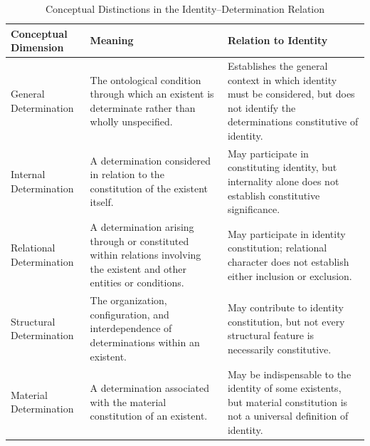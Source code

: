%
%

\begin{table}[htbp]
\centering
\caption{Conceptual Distinctions in the Identity--Determination Relation}
\label{tab:identity-determination-conceptual-distinctions}

\small
\renewcommand{\arraystretch}{1.3}

\begin{tabular}{p{} p{} p{}}
\hline
\textbf{Conceptual Dimension}
&
\textbf{Meaning}
&
\textbf{Relation to Identity}
\\
\hline

General Determination
&
The ontological condition through which an existent is determinate rather than wholly unspecified.
&
Establishes the general context in which identity must be considered, but does not identify the determinations constitutive of identity.
\\
\hline

Internal Determination
&
A determination considered in relation to the constitution of the existent itself.
&
May participate in constituting identity, but internality alone does not establish constitutive significance.
\\
\hline

Relational Determination
&
A determination arising through or constituted within relations involving the existent and other entities or conditions.
&
May participate in identity constitution; relational character does not establish either inclusion or exclusion.
\\
\hline

Structural Determination
&
The organization, configuration, and interdependence of determinations within an existent.
&
May contribute to identity constitution, but not every structural feature is necessarily constitutive.
\\
\hline

Material Determination
&
A determination associated with the material constitution of an existent.
&
May be indispensable to the identity of some existents, but material constitution is not a universal definition of identity.
\\
\hline


\end{tabular}
\end{table}
